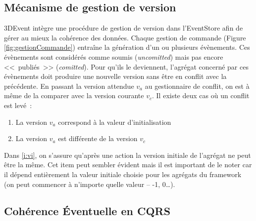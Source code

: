 \subsection{Mécanisme de gestion de version}
3DEvent intègre une procédure de gestion de version dans l'\gls{EventStore} afin 
de gérer au mieux la cohérence des données. 
Chaque gestion de commande (Figure \ref{fig:gestionCommande}) entraîne la 
génération d'un ou plusieurs évènements. Ces évènements sont considérés 
comme \og soumis\fg{} (\textit{uncomitted}) mais pas encore <<~publiés~>> 
(\textit{comitted}).  Pour qu'ils le deviennent, l'agrégat concerné par ces 
évènements doit produire une nouvelle version sans être en conflit avec la 
précédente. En passant la version attendue $v_a$ au gestionnaire de conflit, on 
est à même de la comparer avec la version courante $v_c$. Il existe deux cas où 
un conflit est levé~: 
\begin{enumerate}[label=\alph*)]
	\item \label{i:vi} La version $v_a$ correspond à la valeur d'initialisation
	\item \label{i:vdiff} La version $v_a$ est différente de la version $v_c$
\end{enumerate}
Dans \ref{i:vi}, on s'assure qu'après une action la version initiale de l'agrégat ne 
peut être la même. Cet item peut sembler évident mais il est important de le noter 
car il dépend entièrement la valeur initiale choisie pour les agrégats du 
\gls{framework} (on peut commencer à n'importe quelle valeur -- -1, 0\ldots).



\subsection{Cohérence Éventuelle en CQRS}


